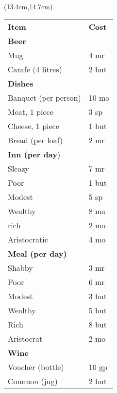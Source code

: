 \documentclass[a4paper,12 pt,openany]{book}
\begin{document}
\begin{textblock*}{6cm}(13.4cm,14.7cm) %

\begin{tabular}{ll}
\textbf{Item}&\textbf{Cost}\\
\textbf{Beer}&\\
Mug&4 mr\\
Carafe (4 litres)&2 but\\
\textbf{Dishes} &\\
Banquet (per person)&10 mo\\
Meat, 1 piece&3 sp\\
Cheese, 1 piece&1 but\\
Bread (per loaf)&2 mr\\
\textbf{Inn (per day})&\\
Sleazy&7 mr\\
Poor&1 but\\
Modest&5 sp\\
Wealthy&8 ma\\
rich&2 mo\\
Aristocratic&4 mo\\
\textbf{Meal (per day)}&\\
Shabby&3 mr\\
Poor&6 mr\\
Modest&3 but\\
Wealthy&5 but\\
Rich&8 but\\
Aristocrat&2 mo\\
\textbf{Wine}&\\
Voucher (bottle)&10 gp\\
Common (jug)&2 but\\
\end{tabular}

\end{textblock*}

~\newpage
\end{document}
